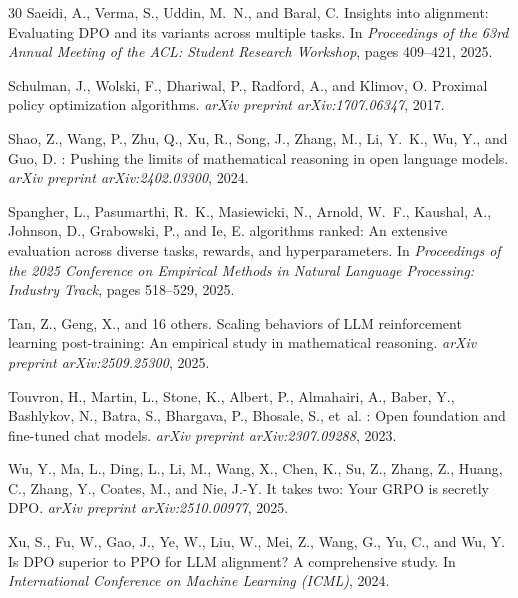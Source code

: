 \documentclass{article}
\begin{document}
\begin{thebibliography}{30}
Saeidi, A., Verma, S., Uddin, M.~N., and Baral, C.
\newblock Insights into alignment: Evaluating {DPO} and its variants across multiple tasks.
\newblock In \emph{Proceedings of the 63rd Annual Meeting of the ACL: Student Research Workshop}, pages 409--421, 2025.

Schulman, J., Wolski, F., Dhariwal, P., Radford, A., and Klimov, O.
\newblock Proximal policy optimization algorithms.
\newblock \emph{arXiv preprint arXiv:1707.06347}, 2017.

Shao, Z., Wang, P., Zhu, Q., Xu, R., Song, J., Zhang, M., Li, Y.~K., Wu, Y., and Guo, D.
: Pushing the limits of mathematical reasoning in open language models.
\newblock \emph{arXiv preprint arXiv:2402.03300}, 2024.

Spangher, L., Pasumarthi, R.~K., Masiewicki, N., Arnold, W.~F., Kaushal, A., Johnson, D., Grabowski, P., and Ie, E.
 algorithms ranked: An extensive evaluation across diverse tasks, rewards, and hyperparameters.
\newblock In \emph{Proceedings of the 2025 Conference on Empirical Methods in Natural Language Processing: Industry Track}, pages 518--529, 2025.

Tan, Z., Geng, X., and 16 others.
\newblock Scaling behaviors of {LLM} reinforcement learning post-training: An empirical study in mathematical reasoning.
\newblock \emph{arXiv preprint arXiv:2509.25300}, 2025.

Touvron, H., Martin, L., Stone, K., Albert, P., Almahairi, A., Baber, Y., Bashlykov, N., Batra, S., Bhargava, P., Bhosale, S., et~al.
: Open foundation and fine-tuned chat models.
\newblock \emph{arXiv preprint arXiv:2307.09288}, 2023.

Wu, Y., Ma, L., Ding, L., Li, M., Wang, X., Chen, K., Su, Z., Zhang, Z., Huang, C., Zhang, Y., Coates, M., and Nie, J.-Y.
\newblock It takes two: Your {GRPO} is secretly {DPO}.
\newblock \emph{arXiv preprint arXiv:2510.00977}, 2025.

Xu, S., Fu, W., Gao, J., Ye, W., Liu, W., Mei, Z., Wang, G., Yu, C., and Wu, Y.
\newblock Is {DPO} superior to {PPO} for {LLM} alignment? {A} comprehensive study.
\newblock In \emph{International Conference on Machine Learning (ICML)}, 2024.


\end{thebibliography}
\end{document}
